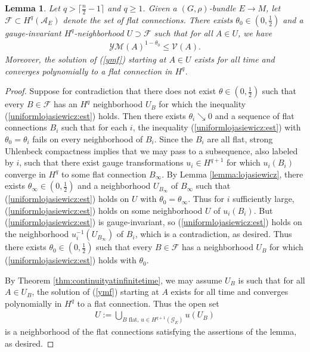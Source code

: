 \documentclass[12pt]{amsart}
\renewcommand{\1}{{\mathbf 1}}
\newtheorem{lemma}[thm]{Lemma}
\theoremstyle{others}
\numberwithin{equation}{section}
\begin{document}
\begin{lemma}\label{lemma:uniformlojasiewicz}
    Let \(q > \lceil\frac{n}{2}-1\rceil\) and \(q \geq 1\).
    Given a \( (G, \rho) \)-bundle \(E \to M\), let $\mathcal{F} \subset H^q \left(\mathcal{A}_E\right)$
    denote the set of flat connections. There exists \(\theta_0 \in (0, \frac12) \) and a gauge-invariant $H^q$-neighborhood \(U \supset \mathcal{F}\) such that for all \(A \in U\), we have
    \begin{align}\label{uniformlojasiewicz:est}
    \mathcal{YM}(A)^{1 - \theta_0} \leq \mathcal{V}(A).
\end{align} 
Moreover, the solution of (\ref{ymf}) starting at \(A \in U\) exists for all time and converges polynomially to a flat connection in $H^q$.
\end{lemma}
\begin{proof}
    Suppose for %
    contradiction that there does not exist \(\theta \in (0, \frac{1}{2})\) such that every \(B \in \mathcal{F}\) has an \(H^q\) neighborhood \(U_B\) for which the inequality (\ref{uniformlojasiewicz:est}) holds. Then there exists \(\theta_i \searrow 0\) and a sequence of flat connections \(B_i\) such that for each \(i\), the inequality (\ref{uniformlojasiewicz:est}) with \(\theta_0 = \theta_i\) fails on every neighborhood of \(B_i\). Since the \(B_i\) are all flat, strong Uhlenbeck compactness implies that we may pass to a subsequence, also labeled by \(i\), such that there exist gauge transformations \(u_i \in H^{q+1}\) for which \(u_i(B_i)\) converge in \(H^q\) to some flat connection \(B_\infty\). By Lemma \ref{lemma:lojasiewicz}, there exists \(\theta_\infty \in (0, \frac{1}{2})\) and a neighborhood \(U_{B_\infty}\) of \(B_\infty\) such that (\ref{uniformlojasiewicz:est}) holds on \(U\) with \(\theta_0 = \theta_\infty\). Thus for \(i\) sufficiently large, (\ref{uniformlojasiewicz:est}) holds on some neighborhood \(U\) of \(u_i(B_i)\). But (\ref{uniformlojasiewicz:est}) is gauge-invariant, so (\ref{uniformlojasiewicz:est}) holds on the neighborhood \(u_i^{-1}(U_{B_{\infty}})\) of \(B_i\), which is a contradiction, as desired. Thus there exists \(\theta_0 \in (0, \frac{1}{2})\) such that every \(B \in \mathcal{F}\) has a neighborhood \(U_B\) for which (\ref{uniformlojasiewicz:est}) holds with \(\theta_0\). \par 
    By Theorem \ref{thm:continuityatinfinitetime}, we may assume \(U_B\) is such that for all \(A \in U_B\), the solution of (\ref{ymf}) starting at \(A\) exists for all time and converges polynomially in \(H^q\) to a flat connection. Thus the open set
    \begin{align*}
        U := \bigcup_{B \text{ flat, } u \in H^{q+1}(\mathcal{G}_E)} u(U_B)
    \end{align*}is a neighborhood of the flat connections satisfying the assertions of the lemma, as desired. 
\end{proof}
\end{document}
